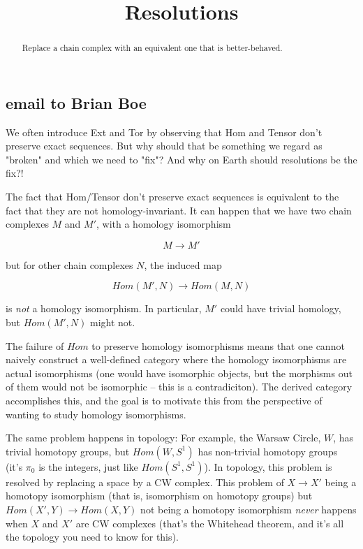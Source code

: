 \documentclass[nooutcomes]{ximera}
\title{Resolutions}
\begin{document}
\begin{abstract}
  Replace a chain complex with an equivalent one that is better-behaved.
\end{abstract}
\maketitle



\subsection{email to Brian Boe}

We often introduce Ext and Tor by observing that Hom and Tensor don't preserve exact sequences.  But why should that be something we regard as "broken" and which we need to "fix"?  And why on Earth should resolutions be the fix?!

The fact that Hom/Tensor don't preserve exact sequences is equivalent to the fact that they are not homology-invariant.  It can happen that we have two chain complexes $M$ and $M'$, with a homology isomorphism

\[
M \to M'
\]

but for other chain complexes $N$, the induced map

\[
Hom(M',N) \to Hom(M,N)
\]

is \emph{not} a homology isomorphism.  In particular, $M'$ could have trivial homology, but $Hom(M',N)$ might not.

The failure of $Hom$ to preserve homology isomorphisms means that one cannot naively construct a well-defined category where the homology isomorphisms are actual isomorphisms (one would have isomorphic objects, but the morphisms out of them would not be isomorphic -- this is a contradiciton).  The derived category accomplishes this, and the goal is to motivate this from the perspective of wanting to study homology isomorphisms.

The same problem happens in topology: For example, the Warsaw Circle,
$W$, has trivial homotopy groups, but $Hom(W, S^1)$ has non-trivial
homotopy groups (it's $\pi_0$ is the integers, just like $Hom(S^1,
S^1)$).  In topology, this problem is resolved by replacing a space by
a CW complex.  This problem of $X \to X'$ being a homotopy isomorphism (that is, isomorphism on homotopy groups) but $Hom(X',Y) \to Hom(X,Y)$ not being a homotopy isomorphism \emph{never} happens when $X$ and $X'$ are CW complexes (that's the Whitehead theorem, and it's all the topology you need to know for this).
\end{document}
